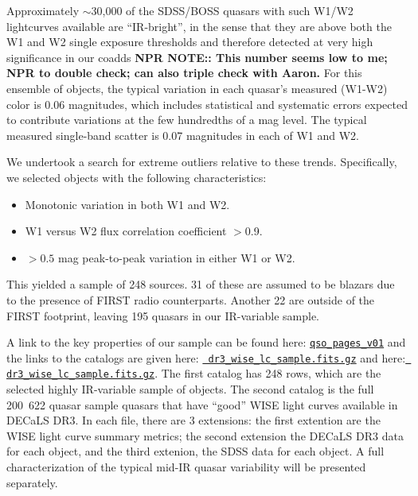 \documentclass[11pt,a4paper]{article}
\begin{document}
Approximately $\sim$30,000 of the SDSS/BOSS quasars with such W1/W2
lightcurves available are ``IR-bright'', in the sense that they are
above both the W1 and W2 single exposure thresholds and therefore
detected at very high significance in our coadds {\bf NPR NOTE:: This
number seems low to me; NPR to double check; can also triple check
with Aaron.}  For this ensemble of objects, the typical variation in
each quasar's measured (W1-W2) color is 0.06 magnitudes, which
includes statistical and systematic errors expected to contribute
variations at the few hundredths of a mag level. The typical measured
single-band scatter is 0.07 magnitudes in each of W1 and W2.

We undertook a search for extreme outliers relative to these trends.
Specifically, we selected objects with the following characteristics:
\begin{itemize}
    \item Monotonic variation in both W1 and W2.
    \item W1 versus W2 flux correlation coefficient $>$0.9.
    \item $>0.5$ mag peak-to-peak variation in either W1 or W2.
\end{itemize}
This yielded a sample of 248 sources. 31 of these are assumed to be
blazars due to the presence of FIRST radio counterparts. Another 22
are outside of the FIRST footprint, leaving 195 quasars in our
IR-variable sample.

A link to the key properties of our sample can be found here:
\href{http://portal.nersc.gov/project/cosmo/temp/ameisner/qso\_pages\_v01/}
{\tt qso\_pages\_v01} and the links to the catalogs are given here:
\href{http://portal.nersc.gov/project/cosmo/temp/ameisner/dr3_wise_lc_sample.fits.gz}{{\tt
dr3\_wise\_lc\_sample.fits.gz}} and here:
\href{http://portal.nersc.gov/project/cosmo/temp/ameisner/dr3_wise_lc_metrics_all_qso.fits.gz}{{\tt
dr3\_wise\_lc\_sample.fits.gz}}.  The first catalog has 248 rows,
which are the selected highly IR-variable sample of objects.  The
second catalog is the full \hbox{200 622} quasar sample quasars that
have ``good'' WISE light curves available in DECaLS DR3. In each file,
there are 3 extensions: the first extention are the WISE light curve
summary metrics; the second extension the DECaLS DR3 data for each
object, and the third extenion, the SDSS data for each object.
A full characterization of the typical mid-IR quasar variability will be
presented separately.
\end{document}
